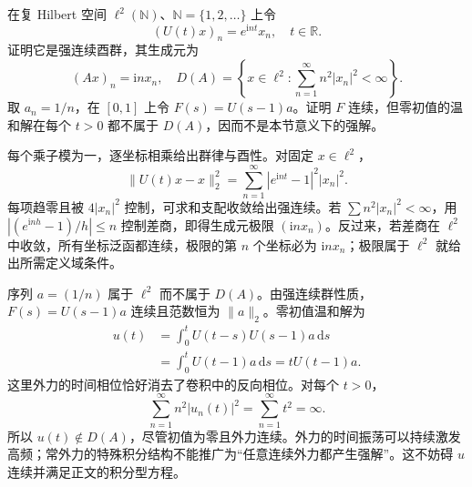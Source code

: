 \begin{exercise}\label{b2:ex:app-D-8}
在复 Hilbert 空间 \(\ell^2(\mathbb N)\)、\(\mathbb N=\{1,2,\ldots\}\) 上令
\[
 (U(t)x)_n=e^{\mathrm int}x_n,\quad t\in\mathbb R.
\]
证明它是强连续酉群，其生成元为
\[
 (Ax)_n=\mathrm inx_n,\quad
 D(A)=\left\{x\in\ell^2:\sum_{n=1}^\infty n^2|x_n|^2<\infty\right\}.
\]
取 \(a_n=1/n\)，在 \([0,1]\) 上令 \(F(s)=U(s-1)a\)。证明 \(F\) 连续，但零初值的温和解在每个 \(t>0\) 都不属于 \(D(A)\)，因而不是本节意义下的强解。
\end{exercise}
\begin{solution}
每个乘子模为一，逐坐标相乘给出群律与酉性。对固定 \(x\in\ell^2\)，
\[
 \|U(t)x-x\|_2^2=\sum_{n=1}^\infty|e^{\mathrm int}-1|^2|x_n|^2.
\]
每项趋零且被 \(4|x_n|^2\) 控制，可求和支配收敛给出强连续。若 \(\sum n^2|x_n|^2<\infty\)，用 \(|(e^{\mathrm inh}-1)/h|\leq n\) 控制差商，即得生成元极限 \((\mathrm inx_n)\)。反过来，若差商在 \(\ell^2\) 中收敛，所有坐标泛函都连续，极限的第 \(n\) 个坐标必为 \(\mathrm inx_n\)；极限属于 \(\ell^2\) 就给出所需定义域条件。

序列 \(a=(1/n)\) 属于 \(\ell^2\) 而不属于 \(D(A)\)。由强连续群性质，\(F(s)=U(s-1)a\) 连续且范数恒为 \(\|a\|_2\)。零初值温和解为
\[
 \begin{aligned}
 u(t)&=\int_0^tU(t-s)U(s-1)a\,\mathrm ds\\
 &=\int_0^tU(t-1)a\,\mathrm ds=tU(t-1)a.
 \end{aligned}
\]
这里外力的时间相位恰好消去了卷积中的反向相位。对每个 \(t>0\)，
\[
 \sum_{n=1}^\infty n^2|u_n(t)|^2
 =\sum_{n=1}^\infty t^2=\infty.
\]
所以 \(u(t)\notin D(A)\)，尽管初值为零且外力连续。外力的时间振荡可以持续激发高频；常外力的特殊积分结构不能推广为“任意连续外力都产生强解”。这不妨碍 \(u\) 连续并满足正文的积分型方程。
\end{solution}

